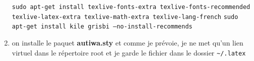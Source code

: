\documentclass[a4paper,twoside]{article}
\begin{document}
\begin{enumerate}
\texttt{sudo apt-get install texlive-fonts-extra texlive-fonts-recommended texlive-latex-extra texlive-math-extra texlive-lang-french}
\texttt{sudo apt-get install kile grisbi --no-install-recommends}

%
\item on installe le paquet \textbf{autiwa.sty} et comme je prévoie, je ne met qu'un lien virtuel dans le répertoire root et je garde le fichier dans le dossier \verb|~/.latex|



\end{enumerate}
\end{document}

